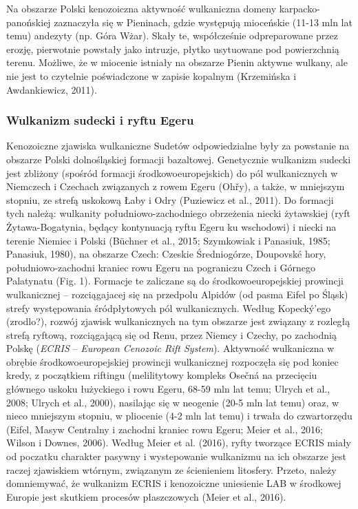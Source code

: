 \documentclass[11.5pt,twoside]{report}
\begin{document}
Na obszarze Polski kenozoiczna aktywność wulkaniczna domeny karpacko-panońskiej zaznaczyła się w Pieninach, gdzie występują mioceńskie (11-13 mln lat temu) andezyty (np. Góra Wżar). Skały te, współcześnie odpreparowane przez erozję, pierwotnie powstały jako intruzje, płytko usytuowane pod powierzchnią terenu. Możliwe, że w miocenie istniały na obszarze Pienin aktywne wulkany, ale nie jest to czytelnie poświadczone w zapisie kopalnym (Krzemińska i Awdankiewicz, 2011).

	\subsubsection{Wulkanizm sudecki i ryftu Egeru}

Kenozoiczne zjawiska wulkaniczne Sudetów odpowiedzialne były za powstanie na obszarze Polski dolnośląskiej formacji bazaltowej. Genetycznie wulkanizm sudecki jest zbliżony (spośród formacji środkowoeuropejskich) do pól wulkanicznych w Niemczech i Czechach związanych z rowem Egeru (Oh\v{r}y), a także, w mniejszym stopniu, ze strefą uskokową Łaby i Odry (Puziewicz et al., 2011). Do formacji tych należą: wulkanity południowo-zachodniego obrzeżenia niecki żytawskiej (ryft Żytawa-Bogatynia, będący kontynuacją ryftu Egeru ku wschodowi) i niecki  na terenie Niemiec i Polski (B\"{u}chner et al., 2015; Szymkowiak i Panasiuk, 1985; Panasiuk, 1980), na obszarze Czech: Czeskie Średniogórze, Doupovské hory, południowo-zachodni kraniec rowu Egeru na pograniczu Czech i Górnego Palatynatu (Fig. 1). Formacje te zaliczane są do środkowoeuropejskiej prowincji wulkanicznej -- rozciągajacej się na przedpolu Alpidów (od pasma Eifel po Śląsk) strefy występowania śródpłytowych pól wulkanicznych. Według Kopeck\'{y}'ego (zrodlo?), rozwój zjawisk wulkanicznych na tym obszarze jest związany z rozległą strefą ryftową, rozciągającą się od Renu, przez Niemcy i Czechy, po zachodnią Polskę (\textit{ECRIS} -- \textit{European Cenozoic Rift System}). Aktywność wulkaniczna w obrębie środkowoeuropejskiej prowincji wulkanicznej rozpoczęła się pod koniec kredy, z początkiem riftingu (melilitytowy kompleks Osečná na przecięciu głównego uskoku łużyckiego i rowu Egeru, 68-59 mln lat temu; Ulrych et al., 2008; Ulrych et al., 2000), nasilając się w neogenie (20-5 mln lat temu) oraz, w nieco mniejszym stopniu, w pliocenie (4-2 mln lat temu) i trwała do czwartorzędu (Eifel, Masyw Centralny i zachodni kraniec rowu Egeru; Meier et al., 2016; Wilson i Downes, 2006). Według Meier et al. (2016), ryfty tworzące ECRIS miały od poczatku charakter pasywny i wystepowanie wulkanizmu na ich obszarze jest raczej zjawiskiem wtórnym, związanym ze ścienieniem litosfery. Przeto, należy domniemywać, że wulkanizm ECRIS i kenozoiczne uniesienie LAB w środkowej Europie jest skutkiem procesów płaszczowych (Meier et al., 2016).
\end{document}
